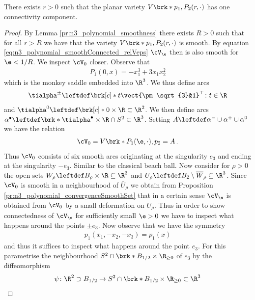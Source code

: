 \begin{lemma}[Connectedness]\label{pr:n3_polynomial_smoothConnected}
  There exists $r>0$ such that the planar variety $V\brk*{p_1,P_2(r,\cdot)}$
  has one connectivity component.
\end{lemma}
\begin{proof}
  By Lemma \ref{pr:n3_polynomial_smoothness} there exists $R>0$ such that for all $r>R$ we have that the
  variety $V\brk*{p_1,P_2(r,\cdot)}$ is smooth.
  By equation \eqref{eq:n3_polynomial_smoothConnected_relVeps}
  $\cV_\e$ then is also smooth for $\e<1/R$.
  We inspect $\cV_0$ closer.
  Observe that
  \begin{align*}
    P_1(0,x)=-x_1^3+3x_1x_2^2
  \end{align*}
  which is the monkey saddle embedded into $\R^3$. We thus define arcs
  \begin{align*}
    \tialpha^\pm\leftdef\brk[c]*{t\vect{\pm\sqrt{3}&1}^\top \colon t\in\R}
  \end{align*}
  and $\tialpha^0\leftdef\brk[c]*{0}\times\R\subset\R^2$.
  We then define arcs $\alpha^\bullet\leftdef\brk*{\tialpha^\bullet\times\R}\cap S^2\subset\R^3$.
  Setting $A\leftdef\alpha^-\cup\alpha^+\cup\alpha^0$
  we have the relation
  \begin{align*}
    \cV_0=V\brk*{P_1(\e,\cdot),p_2}
    =A\,.
  \end{align*}
  Thus $\cV_0$ consists of six smooth arcs originating at the singularity $e_3$ and
  ending at the singularity $-e_3$. Similar to the classical beach ball.
  Now consider for $\rho>0$ the open sets $W_\rho\leftdef B_\rho\times\R\subseteq\R^3$ and $U_\rho\leftdef B_2\setminus \overline{W}_\rho\subseteq\R^3$.
  Since $\cV_0$ is smooth in a neighbourhood of $\overline{U}_\rho$ we obtain from Proposition \ref{pr:n3_polynomial_convergenceSmoothSet}
  that in a certain sense $\cV_\e$ is obtained from $\cV_0$ by a small deformation on $U_\rho$.
  Thus in order to show connectedness of $\cV_\e$ for sufficiently small $\e>0$ we have to inspect what happens
  around the points $\pm e_3$.
  Now observe that we have the symmetry
  \begin{align}
    p_1(x_1,-x_2,-x_3)=p_1(x)\label{eq:n3_polynomial_smoothConnected_symmetr}
  \end{align}
  and thus it suffices to inspect what happens around the point $e_3$.
  For this parametrise the neigh\-bour\-hood $S^2\cap \brk*{B_{1/2}\times\R_{\geq0}}$
  of $e_3$
  by the diffeomorphism
  \begin{align*}
    \psi\colon \R^2\supset B_{1/2}&\to S^2\cap \brk*{B_{1/2}\times\R_{\geq0}}\subset\R^3\\

\end{align*}
\end{proof}
